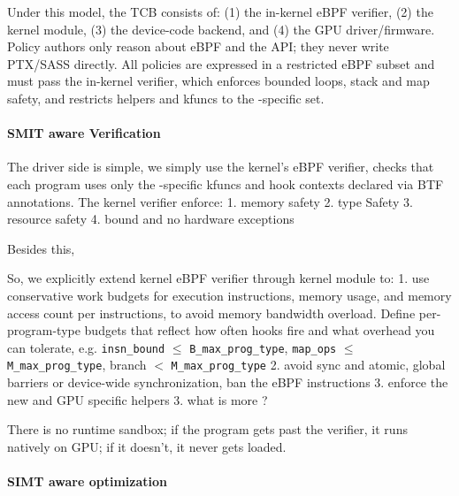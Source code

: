 Under this model, the \sys TCB consists of: (1) the in-kernel eBPF verifier, (2) the \sys kernel module, (3) the device-code backend, and (4) the GPU driver/firmware. Policy authors only reason about eBPF and the \sys API; they never write PTX/SASS directly. All policies are expressed in a restricted eBPF subset and must pass the in-kernel verifier, which enforces bounded loops, stack and map safety, and restricts helpers and kfuncs to the \sys-specific set.

\paragraph{SMIT aware Verification}

The driver side is simple, we simply use the kernel's eBPF verifier, checks that each program uses only the \sys-specific kfuncs and hook contexts declared via BTF annotations. The kernel verifier enforce:
1. memory safety
2. type Safety
3. resource safety
4. bound and no hardware exceptions

Besides this,

So, we explicitly extend kernel eBPF verifier through kernel module to:
1. use conservative work budgets for execution instructions, memory usage, and memory access count per instructions, to avoid memory bandwidth overload. Define per-program-type budgets that reflect how often hooks fire and what overhead you can tolerate, e.g. \texttt{insn\_bound} $\le$ \texttt{B\_max\_prog\_type}, \texttt{map\_ops} $\le$ \texttt{M\_max\_prog\_type}, branch $<$ \texttt{M\_max\_prog\_type}
2. avoid sync and atomic, global barriers or device-wide synchronization, ban the eBPF instructions
3. enforce the new and GPU specific helpers
3. what is more ?

There is no runtime sandbox; if the program gets past the verifier, it runs natively on GPU; if it doesn't, it never gets loaded.

\paragraph{SIMT aware optimization}

